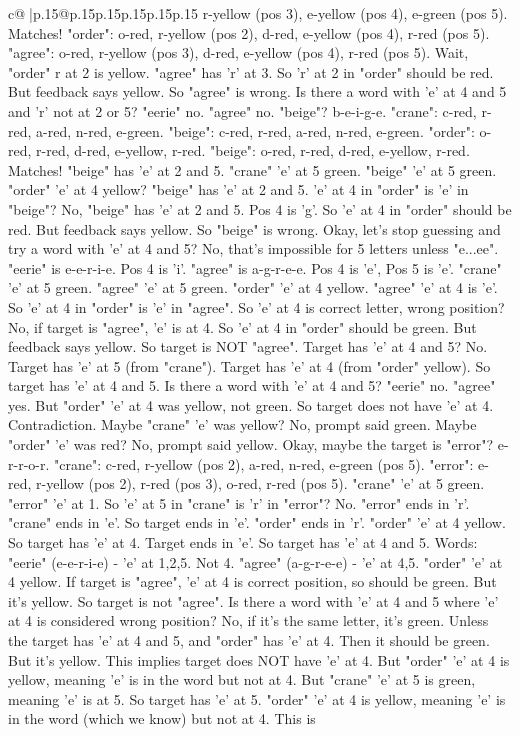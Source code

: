 \documentclass{article}
\begin{document}
{\begin{supertabular}{c@{$\;$}|p{.15\linewidth}@{}p{.15\linewidth}p{.15\linewidth}p{.15\linewidth}p{.15\linewidth}p{.15\linewidth}}
{{{r{-}yellow (pos 3), e{-}yellow (pos 4), e{-}green (pos 5). Matches! "order": o{-}red, r{-}yellow (pos 2), d{-}red, e{-}yellow (pos 4), r{-}red (pos 5). "agree": o{-}red, r{-}yellow (pos 3), d{-}red, e{-}yellow (pos 4), r{-}red (pos 5). Wait, "order" r at 2 is yellow. "agree" has 'r' at 3. So 'r' at 2 in "order" should be red. But feedback says yellow. So "agree" is wrong. Is there a word with 'e' at 4 and 5 and 'r' not at 2 or 5? "eerie" no. "agree" no. "beige"? b{-}e{-}i{-}g{-}e. "crane": c{-}red, r{-}red, a{-}red, n{-}red, e{-}green. "beige": c{-}red, r{-}red, a{-}red, n{-}red, e{-}green. "order": o{-}red, r{-}red, d{-}red, e{-}yellow, r{-}red. "beige": o{-}red, r{-}red, d{-}red, e{-}yellow, r{-}red. Matches! "beige" has 'e' at 2 and 5. "crane" 'e' at 5 green. "beige" 'e' at 5 green. "order" 'e' at 4 yellow? "beige" has 'e' at 2 and 5. 'e' at 4 in "order" is 'e' in "beige"? No, "beige" has 'e' at 2 and 5. Pos 4 is 'g'. So 'e' at 4 in "order" should be red. But feedback says yellow. So "beige" is wrong. Okay, let's stop guessing and try a word with 'e' at 4 and 5? No, that's impossible for 5 letters unless "e...ee". "eerie" is e{-}e{-}r{-}i{-}e. Pos 4 is 'i'. "agree" is a{-}g{-}r{-}e{-}e. Pos 4 is 'e', Pos 5 is 'e'. "crane" 'e' at 5 green. "agree" 'e' at 5 green. "order" 'e' at 4 yellow. "agree" 'e' at 4 is 'e'. So 'e' at 4 in "order" is 'e' in "agree". So 'e' at 4 is correct letter, wrong position? No, if target is "agree", 'e' is at 4. So 'e' at 4 in "order" should be green. But feedback says yellow. So target is NOT "agree". Target has 'e' at 4 and 5? No. Target has 'e' at 5 (from "crane"). Target has 'e' at 4 (from "order" yellow). So target has 'e' at 4 and 5. Is there a word with 'e' at 4 and 5? "eerie" no. "agree" yes. But "order" 'e' at 4 was yellow, not green. So target does not have 'e' at 4. Contradiction. Maybe "crane" 'e' was yellow? No, prompt said green. Maybe "order" 'e' was red? No, prompt said yellow. Okay, maybe the target is "error"? e{-}r{-}r{-}o{-}r. "crane": c{-}red, r{-}yellow (pos 2), a{-}red, n{-}red, e{-}green (pos 5). "error": e{-}red, r{-}yellow (pos 2), r{-}red (pos 3), o{-}red, r{-}red (pos 5). "crane" 'e' at 5 green. "error" 'e' at 1. So 'e' at 5 in "crane" is 'r' in "error"? No. "error" ends in 'r'. "crane" ends in 'e'. So target ends in 'e'. "order" ends in 'r'. "order" 'e' at 4 yellow. So target has 'e' at 4. Target ends in 'e'. So target has 'e' at 4 and 5. Words: "eerie" (e{-}e{-}r{-}i{-}e) {-} 'e' at 1,2,5. Not 4. "agree" (a{-}g{-}r{-}e{-}e) {-} 'e' at 4,5. "order" 'e' at 4 yellow. If target is "agree", 'e' at 4 is correct position, so should be green. But it's yellow. So target is not "agree". Is there a word with 'e' at 4 and 5 where 'e' at 4 is considered wrong position? No, if it's the same letter, it's green. Unless the target has 'e' at 4 and 5, and "order" has 'e' at 4. Then it should be green. But it's yellow. This implies target does NOT have 'e' at 4. But "order" 'e' at 4 is yellow, meaning 'e' is in the word but not at 4. But "crane" 'e' at 5 is green, meaning 'e' is at 5. So target has 'e' at 5. "order" 'e' at 4 is yellow, meaning 'e' is in the word (which we know) but not at 4. This is }}}
\end{supertabular}}
\end{document}
